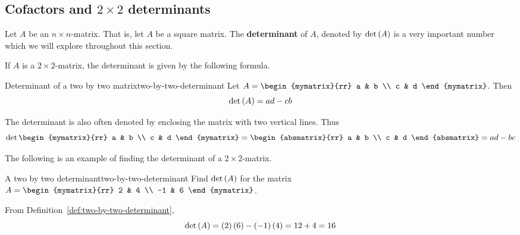 \subsection{Cofactors and \texorpdfstring{$2\times 2$}{2x2} determinants}

Let $A$ be an $n\times n$-matrix. That is, let $A$ be a square matrix. The \textbf{determinant} of $A$, denoted
by $\det \left(A\right) $ is a very important number which we will explore throughout this section. 

If $A$ is a $2\times 2$-matrix, the determinant is given by the following formula.

\begin{definition}{Determinant of a two by two matrix}{two-by-two-determinant}
Let $A=\begin{mymatrix}{rr}
a & b \\
c & d
\end{mymatrix}$. Then
\begin{equation*}
\det \left(A\right)  = ad-cb
\end{equation*}
\end{definition}

The determinant is also often denoted by enclosing the matrix with two
vertical lines. Thus
\begin{equation*}
\det \begin{mymatrix}{rr}
a & b \\
c & d
\end{mymatrix} =\begin{absmatrix}{rr}
a & b \\
c & d
\end{absmatrix} 
=ad - bc
\end{equation*}

The following is an example of finding the determinant of a $2 \times 2$-matrix.

\begin{example}{A two by two determinant}{two-by-two-determinant}
Find $\det\left(A\right) $ for the matrix
$A =  \begin{mymatrix}{rr}
2 & 4 \\
-1 & 6
\end{mymatrix}$.
\end{example}

\begin{solution} From Definition~\ref{def:two-by-two-determinant},
\begin{equation*}
\det \left(A\right) = \left(2\right) \left(6\right) -\left(
-1\right) \left(4\right) = 12 + 4 = 16
\end{equation*}
\end{solution} 

